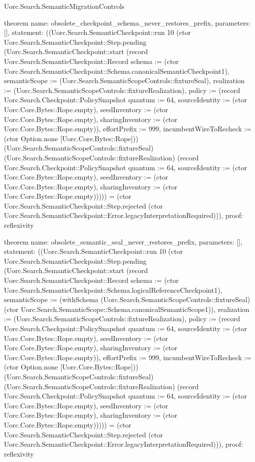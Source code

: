 \begin{lexlean}{Uorc.Search.SemanticMigrationControls}
\begin{semanticmodule}
theorem{
  name: obsolete_checkpoint_schema_never_restores_prefix,
  parameters: [],
  statement: ((Uorc.Search.SemanticCheckpoint::run 10 (ctor Uorc.Search.SemanticCheckpoint::Step.pending (Uorc.Search.SemanticCheckpoint::start (record Uorc.Search.SemanticCheckpoint::Record {schema := (ctor Uorc.Search.SemanticCheckpoint::Schema.canonicalSemanticCheckpoint1), semanticScope := (Uorc.Search.SemanticScopeControls::fixtureSeal), realization := (Uorc.Search.SemanticScopeControls::fixtureRealization), policy := (record Uorc.Search.Checkpoint::PolicySnapshot {quantum := 64, sourceIdentity := (ctor Uorc.Core.Bytes::Rope.empty), seedInventory := (ctor Uorc.Core.Bytes::Rope.empty), sharingInventory := (ctor Uorc.Core.Bytes::Rope.empty)}), effortPrefix := 999, incumbentWireToRecheck := (ctor Option.none [Uorc.Core.Bytes::Rope])}) (Uorc.Search.SemanticScopeControls::fixtureSeal) (Uorc.Search.SemanticScopeControls::fixtureRealization) (record Uorc.Search.Checkpoint::PolicySnapshot {quantum := 64, sourceIdentity := (ctor Uorc.Core.Bytes::Rope.empty), seedInventory := (ctor Uorc.Core.Bytes::Rope.empty), sharingInventory := (ctor Uorc.Core.Bytes::Rope.empty)})))) = (ctor Uorc.Search.SemanticCheckpoint::Step.rejected (ctor Uorc.Search.SemanticCheckpoint::Error.legacyInterpretationRequired))),
  proof: reflexivity{}
}

theorem{
  name: obsolete_semantic_seal_never_restores_prefix,
  parameters: [],
  statement: ((Uorc.Search.SemanticCheckpoint::run 10 (ctor Uorc.Search.SemanticCheckpoint::Step.pending (Uorc.Search.SemanticCheckpoint::start (record Uorc.Search.SemanticCheckpoint::Record {schema := (ctor Uorc.Search.SemanticCheckpoint::Schema.logicalReferenceCheckpoint1), semanticScope := (withSchema (Uorc.Search.SemanticScopeControls::fixtureSeal) (ctor Uorc.Search.SemanticScope::Schema.canonicalSemanticScope1)), realization := (Uorc.Search.SemanticScopeControls::fixtureRealization), policy := (record Uorc.Search.Checkpoint::PolicySnapshot {quantum := 64, sourceIdentity := (ctor Uorc.Core.Bytes::Rope.empty), seedInventory := (ctor Uorc.Core.Bytes::Rope.empty), sharingInventory := (ctor Uorc.Core.Bytes::Rope.empty)}), effortPrefix := 999, incumbentWireToRecheck := (ctor Option.none [Uorc.Core.Bytes::Rope])}) (Uorc.Search.SemanticScopeControls::fixtureSeal) (Uorc.Search.SemanticScopeControls::fixtureRealization) (record Uorc.Search.Checkpoint::PolicySnapshot {quantum := 64, sourceIdentity := (ctor Uorc.Core.Bytes::Rope.empty), seedInventory := (ctor Uorc.Core.Bytes::Rope.empty), sharingInventory := (ctor Uorc.Core.Bytes::Rope.empty)})))) = (ctor Uorc.Search.SemanticCheckpoint::Step.rejected (ctor Uorc.Search.SemanticCheckpoint::Error.legacyInterpretationRequired))),
  proof: reflexivity{}
}


\end{semanticmodule}
\end{lexlean}
